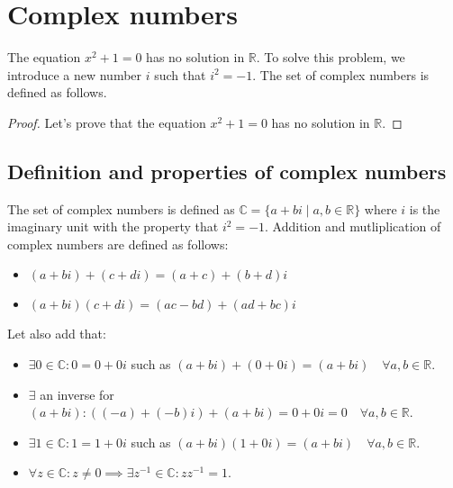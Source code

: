 \chapter{Complex numbers}
The equation $x^2 + 1 = 0$ has no solution in $\mathbb{R}$. To solve this problem, we introduce a new number $i$ such that $i^2 = -1$. The set of complex numbers is defined as follows. \\
\begin{proof}
    Let's prove that the equation $x^2 + 1 = 0$ has no solution in $\mathbb{R}$.
\end{proof}

\section{Definition and properties of complex numbers}
\begin{definition}
    The set of complex numbers is defined as $\mathbb{C} = \{ a + bi \mid a, b \in \mathbb{R} \}$ where $i$ is the imaginary unit with the property that $i^2 = -1$. Addition and mutliplication of complex numbers are defined as follows:
    \begin{itemize}[itemsep=1pt,label=$\circ$]
        \item $(a + bi) + (c + di) = (a + c) + (b + d)i$
        \item $(a + bi)(c + di) = (ac - bd) + (ad + bc)i$
    \end{itemize}
\end{definition}
Let also add that:
\begin{itemize}[itemsep=1pt,label=$\circ$]
    \item $\exists 0 \in \mathbb{C}: 0 = 0 + 0i$ such as $(a + bi) + (0 + 0i) = (a + bi) \quad \forall a, b \in \mathbb{R}$.
    \item $\exists$ an inverse for $(a + bi): ((-a) + (-b)i) + (a + bi) = 0 + 0i = 0 \quad \forall a, b \in \mathbb{R}$.
    \item $\exists 1 \in \mathbb{C}: 1 = 1 + 0i$ such as $(a + bi)(1 + 0i) = (a + bi) \quad \forall a, b \in \mathbb{R}$.
    \item $\forall z \in \mathbb{C} : z \neq 0 \implies \exists z^{-1} \in \mathbb{C} : z z^{-1} = 1$.
\end{itemize}

